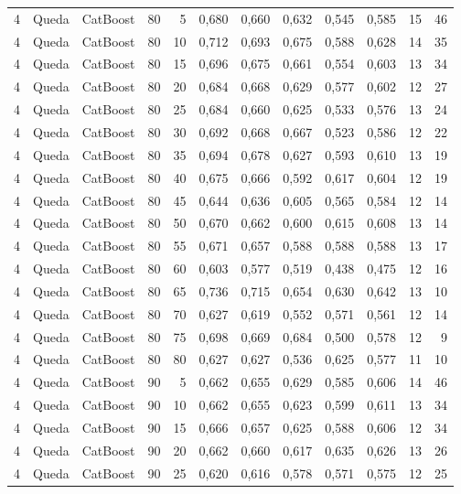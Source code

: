\begin{longtable}{@{}rllrrrrrrrrr@{}}
4 & Queda & CatBoost & 80 & 5 & 0,680 & 0,660 & 0,632 & 0,545 & 0,585 & 15 & 46 \\
4 & Queda & CatBoost & 80 & 10 & 0,712 & 0,693 & 0,675 & 0,588 & 0,628 & 14 & 35 \\
4 & Queda & CatBoost & 80 & 15 & 0,696 & 0,675 & 0,661 & 0,554 & 0,603 & 13 & 34 \\
4 & Queda & CatBoost & 80 & 20 & 0,684 & 0,668 & 0,629 & 0,577 & 0,602 & 12 & 27 \\
4 & Queda & CatBoost & 80 & 25 & 0,684 & 0,660 & 0,625 & 0,533 & 0,576 & 13 & 24 \\
4 & Queda & CatBoost & 80 & 30 & 0,692 & 0,668 & 0,667 & 0,523 & 0,586 & 12 & 22 \\
4 & Queda & CatBoost & 80 & 35 & 0,694 & 0,678 & 0,627 & 0,593 & 0,610 & 13 & 19 \\
4 & Queda & CatBoost & 80 & 40 & 0,675 & 0,666 & 0,592 & 0,617 & 0,604 & 12 & 19 \\
4 & Queda & CatBoost & 80 & 45 & 0,644 & 0,636 & 0,605 & 0,565 & 0,584 & 12 & 14 \\
4 & Queda & CatBoost & 80 & 50 & 0,670 & 0,662 & 0,600 & 0,615 & 0,608 & 13 & 14 \\
4 & Queda & CatBoost & 80 & 55 & 0,671 & 0,657 & 0,588 & 0,588 & 0,588 & 13 & 17 \\
4 & Queda & CatBoost & 80 & 60 & 0,603 & 0,577 & 0,519 & 0,438 & 0,475 & 12 & 16 \\
4 & Queda & CatBoost & 80 & 65 & 0,736 & 0,715 & 0,654 & 0,630 & 0,642 & 13 & 10 \\
4 & Queda & CatBoost & 80 & 70 & 0,627 & 0,619 & 0,552 & 0,571 & 0,561 & 12 & 14 \\
4 & Queda & CatBoost & 80 & 75 & 0,698 & 0,669 & 0,684 & 0,500 & 0,578 & 12 & 9 \\
4 & Queda & CatBoost & 80 & 80 & 0,627 & 0,627 & 0,536 & 0,625 & 0,577 & 11 & 10 \\
4 & Queda & CatBoost & 90 & 5 & 0,662 & 0,655 & 0,629 & 0,585 & 0,606 & 14 & 46 \\
4 & Queda & CatBoost & 90 & 10 & 0,662 & 0,655 & 0,623 & 0,599 & 0,611 & 13 & 34 \\
4 & Queda & CatBoost & 90 & 15 & 0,666 & 0,657 & 0,625 & 0,588 & 0,606 & 12 & 34 \\
4 & Queda & CatBoost & 90 & 20 & 0,662 & 0,660 & 0,617 & 0,635 & 0,626 & 13 & 26 \\
4 & Queda & CatBoost & 90 & 25 & 0,620 & 0,616 & 0,578 & 0,571 & 0,575 & 12 & 25 \\

\end{longtable}
